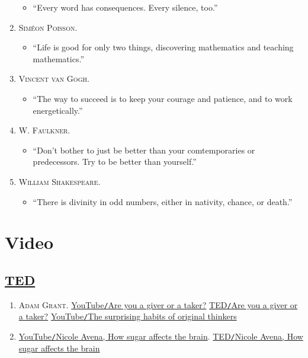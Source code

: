 \documentclass[oneside]{book}
\numberwithin{equation}{section}
\begin{document}
\begin{enumerate}
\begin{itemize}
		\item ``Every word has consequences. Every silence, too.''
	\end{itemize}
	\item \textsc{Sim\'eon Poisson.}
	\begin{itemize}
		\item ``Life is good for only two things, discovering mathematics and teaching mathematics.''
	\end{itemize}
	\item \textsc{Vincent van Gogh.}
	\begin{itemize}
		\item ``The way to succeed is to keep your courage and patience, and to work energetically.''
	\end{itemize}
	\item \textsc{W. Faulkner.}
	\begin{itemize}
		\item ``Don't bother to just be better than your comtemporaries or predecessors. Try to be better than yourself.''
	\end{itemize}
	\item \textsc{William Shakespeare.}
	\begin{itemize}
		\item ``There is divinity in odd numbers, either in nativity, chance, or death.''
	\end{itemize}
\end{enumerate}


\chapter{Video}

\section{\href{https://www.ted.com/}{TED}}

\begin{enumerate}
	\item \textsc{Adam Grant.} \href{https://www.youtube.com/watch?v=YyXRYgjQXX0}{YouTube\texttt{/}Are you a giver or a taker?} \href{https://www.ted.com/talks/adam_grant_are_you_a_giver_or_a_taker}{TED\texttt{/}Are you a giver or a taker?} \href{https://www.youtube.com/watch?v=fxbCHn6gE3U}{YouTube\texttt{/}The surprising habits of original thinkers}
	\item \href{https://www.youtube.com/watch?v=lEXBxijQREo}{YouTube\texttt{/}Nicole Avena, How sugar affects the brain}. \href{https://ed.ted.com/lessons/how-sugar-affects-the-brain-nicole-avena}{TED\texttt{/}Nicole Avena, How sugar affects the brain}
\end{enumerate}
\end{document}
